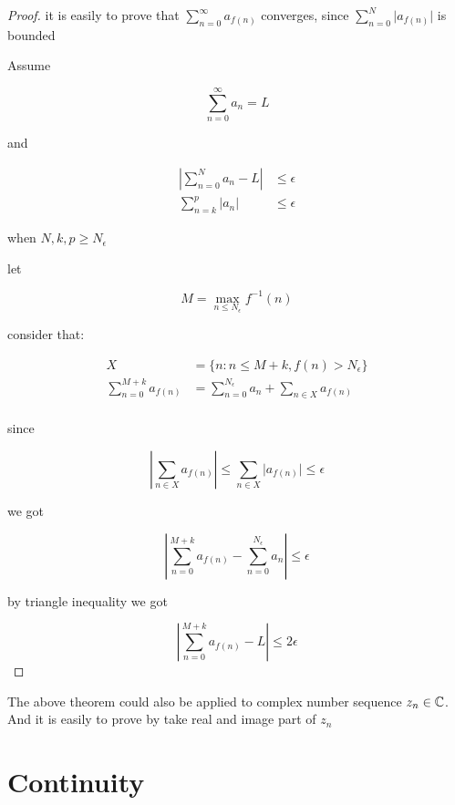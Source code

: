 \begin{proof}
    it is easily to prove that $\sum_{n=0}^{\infty}a_{f(n)}$ converges, since 
    $\sum_{n=0}^{N}\lvert a_{f(n)} \rvert$ is bounded

    Assume 

    \[
        \sum_{n=0}^{\infty}a_{n} = L
    \]

    and

    \begin{align*}
        \left| \sum_{n=0}^{N}a_{n} - L \right| &\le \epsilon \\
        \sum_{n=k}^{p} \lvert a_n \rvert & \le \epsilon
    \end{align*}

    when $N,k,p \ge N_{\epsilon}$
    
    let  
    
    \[ 
        M = \max_{n \le N_{\epsilon}}f^{-1}(n) 
    \]

    consider that:

    \begin{align*}
        X & = \{ n: n \le M+k, f(n) > N_{\epsilon} \} \\
        \sum_{n=0}^{M+k}a_{f(n)} &= \sum_{n=0}^{N_{\epsilon}}a_{n} + \sum_{n \in X}a_{f(n)} \\
    \end{align*}

    since

    \[
        \left| \sum_{n \in X}a_{f(n)} \right| \le \sum_{n \in X}\lvert a_{f(n)} \rvert \le \epsilon
    \]

    we got

    \[
        \left| \sum_{n=0}^{M+k}a_{f(n)} - \sum_{n=0}^{N_{\epsilon}}a_{n} \right| \le \epsilon
    \]

    by triangle inequality we got

    \[
        \left| \sum_{n=0}^{M+k}a_{f(n)} - L \right| \le 2\epsilon
    \]
\end{proof}

\begin{corollary}
    The above theorem could also be applied to complex number sequence $z_n \in \mathbb{C}$.
    And it is easily to prove by take real and image part of $z_n$
\end{corollary}

\section{Continuity}

